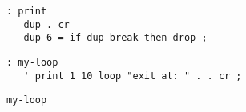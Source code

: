 \documentclass{article}
\begin{document}
 
\begin{verbatim}
: print
   dup . cr 
   dup 6 = if dup break then drop ;
\end{verbatim}
\begin{verbatim}
: my-loop
   ' print 1 10 loop "exit at: " . . cr ;
\end{verbatim}
\begin{verbatim}
my-loop
\end{verbatim}
\end{document}
